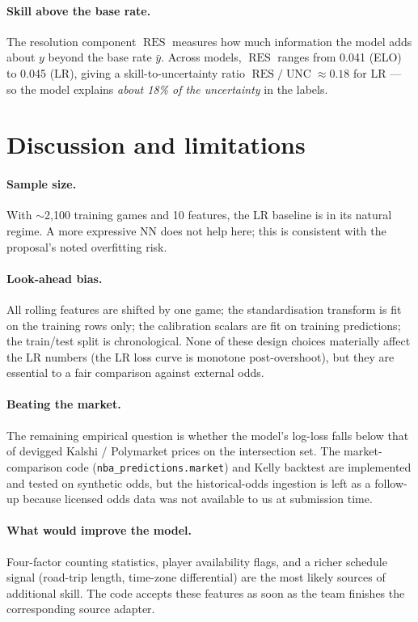 \documentclass[11pt]{article}
\newcommand{\res}{\operatorname{RES}}
\newcommand{\unc}{\operatorname{UNC}}
\begin{document}
\paragraph{Skill above the base rate.} The resolution component
$\res$ measures how much information the model adds about $y$ beyond
the base rate $\bar y$. Across models, $\res$ ranges from 0.041 (ELO) to
0.045 (LR), giving a skill-to-uncertainty ratio
$\res / \unc \approx 0.18$ for LR --- so the model explains
\emph{about 18\% of the uncertainty} in the labels.

\section{Discussion and limitations}

\paragraph{Sample size.} With $\sim$2{,}100 training games and 10
features, the LR baseline is in its natural regime. A more expressive
NN does not help here; this is consistent with the proposal's noted
overfitting risk.

\paragraph{Look-ahead bias.} All rolling features are shifted by one
game; the standardisation transform is fit on the training rows only;
the calibration scalars are fit on training predictions; the
train/test split is chronological. None of these design choices
materially affect the LR numbers (the LR loss curve is monotone
post-overshoot), but they are essential to a fair comparison against
external odds.

\paragraph{Beating the market.} The remaining empirical question is
whether the model's log-loss falls below that of devigged Kalshi /
Polymarket prices on the intersection set. The market-comparison code
(\texttt{nba\_predictions.market}) and Kelly backtest are implemented
and tested on synthetic odds, but the historical-odds ingestion is
left as a follow-up because licensed odds data was not available to us
at submission time.

\paragraph{What would improve the model.} Four-factor counting
statistics, player availability flags, and a richer schedule signal
(road-trip length, time-zone differential) are the most likely sources
of additional skill. The code accepts these features as soon as the
team finishes the corresponding source adapter.
\end{document}
